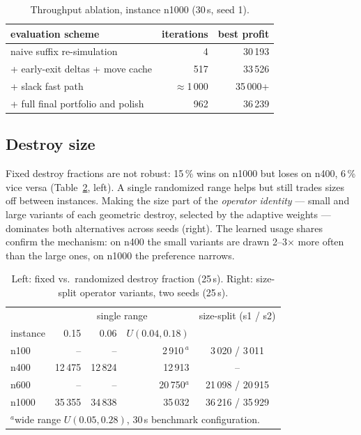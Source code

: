 \documentclass[10pt, a4paper]{article}
\begin{document}
\begin{table}[t]
\centering\small
\caption{Throughput ablation, instance n1000 (30\,s, seed 1).}
\label{tab:throughput}
\begin{tabular}{lrr}
\toprule
evaluation scheme & iterations & best profit \\
\midrule
naive suffix re-simulation                   & 4        & 30\,193 \\
\; + early-exit deltas + move cache          & 517      & 33\,526 \\
\; + slack fast path                          & $\approx$1\,000 & 35\,000+ \\
\; + full final portfolio and polish          & 962      & 36\,239 \\
\bottomrule
\end{tabular}
\end{table}

\subsection{Destroy size}\label{sec:exp-size}
Fixed destroy fractions are not robust: 15\,\% wins on n1000 but loses on
n400, 6\,\% vice versa (Table~\ref{tab:size}, left). A single randomized
range helps but still trades sizes off between instances. Making the size
part of the \emph{operator identity} --- small and large variants of each
geometric destroy, selected by the adaptive weights --- dominates both
alternatives across seeds (right). The learned usage shares confirm the
mechanism: on n400 the small variants are drawn 2--3$\times$ more often than
the large ones, on n1000 the preference narrows.

\begin{table}[t]
\centering\small
\caption{Left: fixed vs.\ randomized destroy fraction (25\,s). Right:
size-split operator variants, two seeds (25\,s).}
\label{tab:size}
\begin{tabular}{lrrr@{\qquad}rr}
\toprule
 & \multicolumn{3}{c}{single range} & \multicolumn{2}{c}{size-split (s1 / s2)} \\
instance & 0.15 & 0.06 & $U(0.04,0.18)$ & \multicolumn{2}{c}{} \\
\midrule
n100  & --      & --      & 2\,910\,$^{a}$ & \multicolumn{2}{c}{3\,020 / 3\,011} \\
n400  & 12\,475 & 12\,824 & 12\,913 & \multicolumn{2}{c}{--} \\
n600  & --      & --      & 20\,750$^{a}$ & \multicolumn{2}{c}{21\,098 / 20\,915} \\
n1000 & 35\,355 & 34\,838 & 35\,032 & \multicolumn{2}{c}{36\,216 / 35\,929} \\
\bottomrule
\multicolumn{6}{l}{\footnotesize $^{a}$wide range $U(0.05,0.28)$, 30\,s benchmark configuration.}
\end{tabular}
\end{table}
\end{document}
